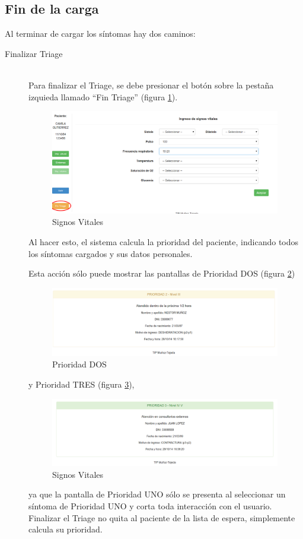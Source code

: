 \subsection{Fin de la carga}
Al terminar de cargar los síntomas hay dos caminos:
\begin{description}
\item[Finalizar Triage]  \mbox{} \\
Para finalizar el Triage, se debe presionar el botón sobre la pestaña izquieda llamado ``Fin Triage'' (figura \ref{fig:fin_triage}).
\begin{figure}
\centerline{\includegraphics[width=0.99\textwidth]{fin_triage.png}}
\caption{Signos Vitales} \label{fig:fin_triage}
\end{figure}
 Al hacer esto, el sistema calcula la prioridad del paciente, indicando todos los síntomas cargados y sus datos personales. 

Esta acción sólo puede mostrar las pantallas de Prioridad DOS (figura \ref{fig:prioridad_dos}) 
\begin{figure}
\centerline{\includegraphics[width=0.99\textwidth]{prioridad_dos.png}}
\caption{Prioridad DOS} \label{fig:prioridad_dos}
\end{figure}
y Prioridad TRES (figura \ref{fig:prioridad_tres}), 
\begin{figure}
\centerline{\includegraphics[width=0.99\textwidth]{prioridad_tres.png}}
\caption{Signos Vitales} \label{fig:prioridad_tres}
\end{figure}
ya que la pantalla de Prioridad UNO sólo se presenta al seleccionar un síntoma de Prioridad UNO y corta toda interacción con el usuario.
Finalizar el Triage no quita al paciente de la lista de espera, simplemente calcula su prioridad. 


\end{description}
